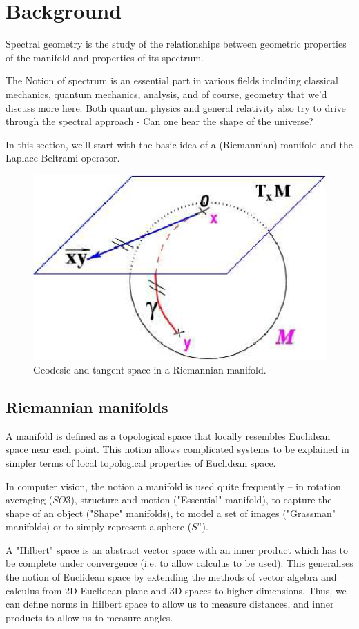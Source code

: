\documentclass[a4paper,10pt]{article}
\begin{document}
\section{Background}

Spectral geometry is the study of the relationships between geometric properties of the manifold and properties of its spectrum.

The Notion of spectrum is an essential part in various fields including classical mechanics, quantum mechanics, analysis, and of course, geometry that we'd discuss more here. Both quantum physics and general relativity also try to drive through the spectral approach - Can one hear the shape of the universe?

In this section, we'll start with the basic idea of a (Riemannian) manifold and the Laplace-Beltrami operator.


\begin{figure}[hbt!]
 \includegraphics[height=0.3\textwidth]{Geodesics2.png}
 \centering
 \caption{\label{fig:Geodesics}Geodesic and tangent space in a Riemannian manifold. \cite{berger2006panoramic}}
\end{figure}

\subsection{Riemannian manifolds}

A manifold is defined as a topological space that locally resembles Euclidean space near each point. This notion allows complicated systems to be explained in simpler terms of local topological properties of Euclidean space.


In computer vision, the notion a manifold is used quite frequently -- in rotation averaging ($ SO3 $), structure and motion ("Essential" manifold), to capture the shape of an object ("Shape" manifolds), to model a set of images ("Grassman" manifolds) or to simply represent a sphere ($ S^n $).

A "Hilbert" space is an abstract vector space with an inner product which has to be complete under convergence (i.e. to allow calculus to be used). This generalises the notion of Euclidean space by extending the methods of vector algebra and calculus from 2D Euclidean plane and 3D spaces to higher dimensions. Thus, we can define norms in Hilbert space to allow us to measure distances, and inner products to allow us to measure angles.
\end{document}
